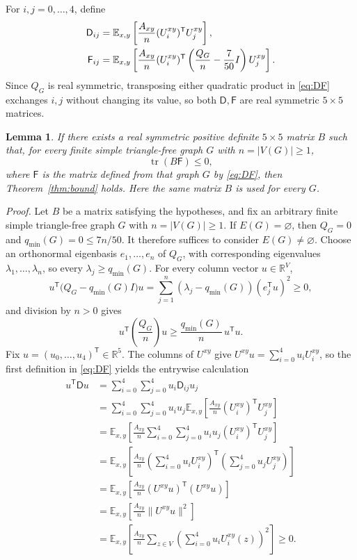\documentclass[11pt]{article}
\newcommand{\E}{\mathbb E}
\newcommand{\R}{\mathbb R}
\newcommand{\tr}{\operatorname{tr}}
\newcommand{\qmin}{q_{\min}}
\newtheorem{lemma}{Lemma}
\begin{document}
For $i,j=0,\ldots,4$, define
\begin{align}
\mathsf D_{ij}
&=\E_{x,y}\left[\frac{A_{xy}}n(U_i^{xy})^{\mathsf T}U_j^{xy}\right],\notag\\
\mathsf F_{ij}
&=\E_{x,y}\left[\frac{A_{xy}}n(U_i^{xy})^{\mathsf T}
\left(\frac{Q_G}{n}-\frac7{50}I\right)
U_j^{xy}\right].
\label{eq:DF}
\end{align}
Since $Q_G$ is real symmetric, transposing either quadratic product in \eqref{eq:DF} exchanges $i,j$ without changing its value, so both $\mathsf D,\mathsf F$ are real symmetric $5\times5$ matrices.
\begin{lemma}\label{lem:sufficient-condition}
If there exists a real symmetric positive definite $5\times5$ matrix $B$
such that, for every finite simple triangle-free graph $G$ with
$n=|V(G)|\geq1$,
\[
\tr(B\mathsf F)\leq0,
\]
where $\mathsf F$ is the matrix defined from that graph $G$ by \eqref{eq:DF},
then Theorem~\ref{thm:bound} holds.
Here the same matrix $B$ is used for every $G$.
\end{lemma}
\noindent\emph{Proof.}
Let $B$ be a matrix satisfying the hypotheses, and fix an arbitrary finite
simple triangle-free graph $G$ with $n=|V(G)|\geq1$.
If $E(G)=\varnothing$, then $Q_G=0$ and $\qmin(G)=0\leq7n/50$.
It therefore suffices to consider $E(G)\ne\varnothing$.
Choose an orthonormal eigenbasis $e_1,\ldots,e_n$ of $Q_G$, with corresponding eigenvalues $\lambda_1,\ldots,\lambda_n$, so every $\lambda_j\geq\qmin(G)$.
For every column vector $u\in\R^V$,
\[
u^{\mathsf T}\big(Q_G-\qmin(G)I\big)u
=\sum_{j=1}^n(\lambda_j-\qmin(G))(e_j^{\mathsf T}u)^2\geq0,
\]
and division by $n>0$ gives
\begin{equation}\label{eq:rayleigh}
u^{\mathsf T}\left(\frac{Q_G}{n}\right)u
\geq\frac{\qmin(G)}n\,u^{\mathsf T}u.
\end{equation}
Fix $u=(u_0,\ldots,u_4)^{\mathsf T}\in\R^5$.
The columns of $U^{xy}$ give
$U^{xy}u=\sum_{i=0}^4u_iU_i^{xy}$, so the first definition in
\eqref{eq:DF} yields the entrywise calculation
\begin{align*}
u^{\mathsf T}\mathsf Du
&=\sum_{i=0}^4\sum_{j=0}^4u_i\mathsf D_{ij}u_j\\
&=\sum_{i=0}^4\sum_{j=0}^4u_i u_j
\E_{x,y}\left[\frac{A_{xy}}n(U_i^{xy})^{\mathsf T}U_j^{xy}\right]\\
&=\E_{x,y}\left[\frac{A_{xy}}n
\sum_{i=0}^4\sum_{j=0}^4u_i u_j(U_i^{xy})^{\mathsf T}U_j^{xy}\right]\\
&=\E_{x,y}\left[\frac{A_{xy}}n
\left(\sum_{i=0}^4u_iU_i^{xy}\right)^{\mathsf T}
\left(\sum_{j=0}^4u_jU_j^{xy}\right)\right]\\
&=\E_{x,y}\left[\frac{A_{xy}}n
(U^{xy}u)^{\mathsf T}(U^{xy}u)\right]\\
&=\E_{x,y}\left[\frac{A_{xy}}n\|U^{xy}u\|^2\right]\\
&=\E_{x,y}\left[\frac{A_{xy}}n
\sum_{z\in V}\left(\sum_{i=0}^4u_iU_i^{xy}(z)\right)^2\right]\geq0.
\end{align*}
\end{document}
